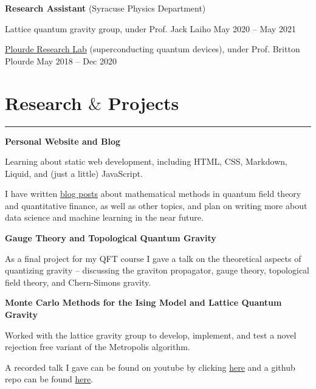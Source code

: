 \documentclass{article}
\newcommand{\myline}{\rule[\baselineskip]{\linewidth}{1pt}}
\begin{document}
\vspace{2.5pt}
\large\textbf{Research Assistant} \normalsize (Syracuse Physics Department)
\normalsize

\begin{compactitem}
\item Lattice quantum gravity group, under Prof. Jack Laiho \hfill \small May 2020 -- May 2021 
\normalsize
\item \href{https://bplourde.expressions.syr.edu/}{Plourde Research Lab} (superconducting quantum devices), under Prof. Britton Plourde \hfill \small May 2018 -- Dec 2020
\end{compactitem}




\section{Research $\&$ Projects}

\myline

\large\textbf{Personal Website and Blog}
\normalsize

\begin{compactitem}
\item Learning about static web development, including HTML, CSS, Markdown, Liquid, and (just a little) JavaScript. 
\item I have written \href{https://aarontrowbridge.github.io/blog/}{blog posts} about mathematical methods in quantum field theory and quantitative finance, as well as other topics, and plan on writing more about data science and machine learning in the near future. 
\end{compactitem}



\vspace{2.5pt}
\large\textbf{Gauge Theory and Topological Quantum Gravity}
\normalsize

\begin{compactitem}
\item As a final project for my QFT course I gave a talk on the theoretical aspects of quantizing gravity -- discussing the graviton propagator, gauge theory, topological field theory, and Chern-Simons gravity.
\end{compactitem}


\vspace{2.5pt}
\large\textbf{Monte Carlo Methods for the Ising Model and Lattice Quantum Gravity}
\normalsize

\begin{compactitem}
\item Worked with the lattice gravity group to develop, implement, and test a novel rejection free variant of the Metropolis algorithm. 
\item A recorded talk I gave can be found on youtube by clicking \href{https://www.youtube.com/watch?v=_Ppx0e3aG-E&t=2s}{here} and a github repo can be found \href{https://github.com/aarontrowbridge/Ising}{here}.
\end{compactitem}
\end{document}
